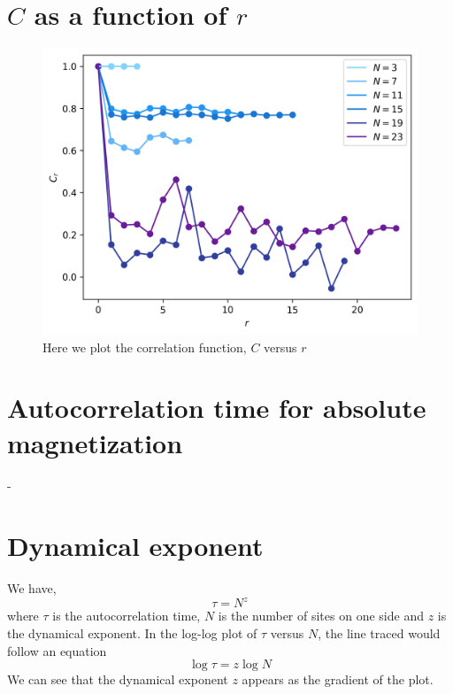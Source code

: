 \documentclass{cernatsnote}
\begin{document}
\section{$C$ as a function of $r$}
\begin{figure}[H]
    \centering
    \includegraphics[scale = 0.7]{images/cvr.png}
    \caption{Here we plot the correlation function, $C$ versus $r$}
    \label{fig:c_v_r}
\end{figure}

\section{Autocorrelation time for absolute magnetization}
-
\section{Dynamical exponent}
We have,
\begin{equation}
    \tau = N^{z}
\end{equation}
where $\tau$ is the autocorrelation time, $N$ is the number of sites on one side and $z$ is the dynamical exponent. In  the log-log plot of $\tau$ versus $N$, the line traced would follow an equation
\begin{equation}
      \log  \tau = z\log  N
\end{equation}
We can see that the dynamical exponent $z$ appears as the gradient of the plot.


\end{document}
